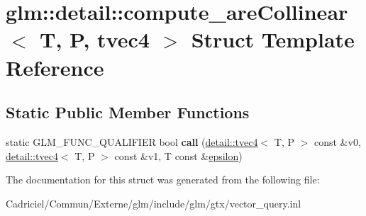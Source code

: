 \hypertarget{structglm_1_1detail_1_1compute__are_collinear_3_01_t_00_01_p_00_01tvec4_01_4}{}\section{glm\+:\+:detail\+:\+:compute\+\_\+are\+Collinear$<$ T, P, tvec4 $>$ Struct Template Reference}
\label{structglm_1_1detail_1_1compute__are_collinear_3_01_t_00_01_p_00_01tvec4_01_4}
\subsection*{Static Public Member Functions}
\begin{DoxyCompactItemize}
\item 
static G\+L\+M\+\_\+\+F\+U\+N\+C\+\_\+\+Q\+U\+A\+L\+I\+F\+I\+ER bool {\bfseries call} (\hyperlink{structglm_1_1detail_1_1tvec4}{detail\+::tvec4}$<$ T, P $>$ const \&v0, \hyperlink{structglm_1_1detail_1_1tvec4}{detail\+::tvec4}$<$ T, P $>$ const \&v1, T const \&\hyperlink{group__gtc__constants_gacb41049b8d22c8aa90e362b96c524feb}{epsilon})\hypertarget{structglm_1_1detail_1_1compute__are_collinear_3_01_t_00_01_p_00_01tvec4_01_4_a4a7e3fba780b73ef237fbf76dc6ead91}{}\label{structglm_1_1detail_1_1compute__are_collinear_3_01_t_00_01_p_00_01tvec4_01_4_a4a7e3fba780b73ef237fbf76dc6ead91}

\end{DoxyCompactItemize}


The documentation for this struct was generated from the following file\+:\begin{DoxyCompactItemize}
\item 
Cadriciel/\+Commun/\+Externe/glm/include/glm/gtx/vector\+\_\+query.\+inl\end{DoxyCompactItemize}
